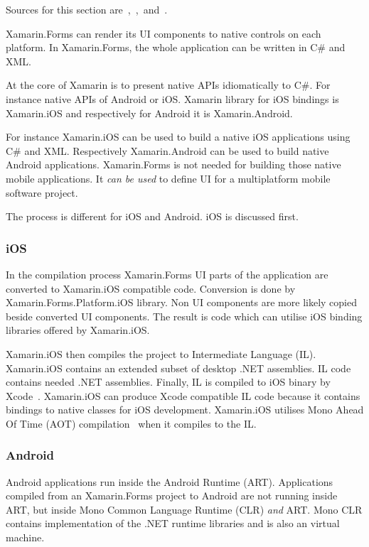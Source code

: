 \documentclass[conference]{IEEEtran}
\begin{document}
Sources for this section are~\cite{xamarin},~\cite{xamarin2},~and~\cite{xamarin3}.

Xamarin.Forms can render its UI components to native controls on each platform. In Xamarin.Forms, the whole application can be written in C\# and XML.

At the core of Xamarin is to present native APIs idiomatically to C\#. For instance native APIs of Android or iOS. Xamarin library for iOS bindings is Xamarin.iOS and respectively for Android it is Xamarin.Android.

For instance Xamarin.iOS can be used to build a native iOS applications using C\# and XML. Respectively Xamarin.Android can be used to build native Android applications. Xamarin.Forms is not needed for building those native mobile applications. It \emph{can be used} to define UI for a multiplatform mobile software project.

The process is different for iOS and Android. iOS is discussed first.

\subsubsection{iOS}

In the compilation process Xamarin.Forms UI parts of the application are converted to Xamarin.iOS compatible code. Conversion is done by Xamarin.Forms.Platform.iOS library. Non UI components are more likely copied beside converted UI components. The result is code which can utilise iOS binding libraries offered by Xamarin.iOS.

Xamarin.iOS then compiles the project to Intermediate Language (IL). Xamarin.iOS contains an extended subset of desktop .NET assemblies. IL code contains needed .NET assemblies. Finally, IL is compiled to iOS binary by Xcode~\cite{xcode}. Xamarin.iOS can produce Xcode compatible IL code because it contains bindings to native classes for iOS development. Xamarin.iOS utilises Mono Ahead Of Time (AOT) compilation~\cite{mono_aot} when it compiles to the IL.

\subsubsection{Android}

Android applications run inside the Android Runtime (ART). Applications compiled from an Xamarin.Forms project to Android are not running inside ART, but inside Mono Common Language Runtime (CLR) \emph{and} ART. Mono CLR contains implementation of the .NET runtime libraries and is also an virtual machine.
\end{document}
